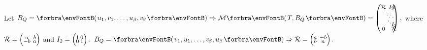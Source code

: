 Let $B_Q=\Par{u_1,v_1,\dots,u_\beta,v_{\:\!\!\beta}}\Rightarrow\Mt{T,B_Q}=\footnotesize\begin{pmatrix}\mR &\hspace{-6pt} I_2 &\hspace{-14pt} &\hspace{-14pt} 0\hspace{-6pt}\\[-4pt]&\hspace{-18pt} \ddots &\hspace{-20pt} \ddots &\hspace{-14pt} \hspace{-6pt}\\[-6pt]&\hspace{-20pt} &\hspace{-20pt} \ddots &\hspace{-14pt} I_2\hspace{-6pt}\\[-3pt]0 &\hspace{-14pt} &\hspace{-14pt} &\hspace{-14pt} \mR\hspace{-6pt}\end{pmatrix},$ where $\mathcal{R}=\footnotesize\begin{pmatrix}a &\hspace{-6pt} b\\[-4pt]-b &\hspace{-6pt} a\end{pmatrix}$ and $I_2=\footnotesize\begin{pmatrix}1 &\hspace{-8pt} 0\\[-4pt]0 &\hspace{-8pt} 1\end{pmatrix}.$\vspace{-10pt}\parNot
\Or $B_Q=\Par{v_1,u_1,\dots,v_{\:\!\!\beta},u_\beta}\Rightarrow\mR=\footnotesize\begin{pmatrix}a &\hspace{-6pt} -b\\[-4pt]b &\hspace{-6pt} a\end{pmatrix}.$
\SepLine



